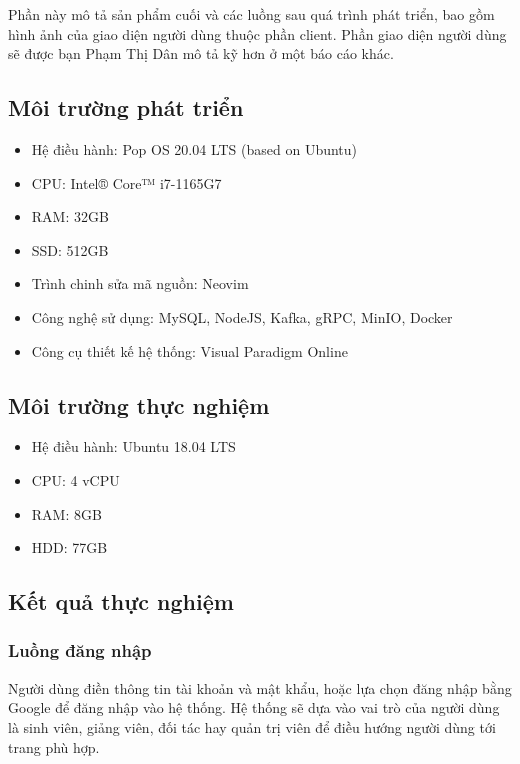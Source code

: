 \documentclass[./../main.tex]{subfiles}
\begin{document}
Phần này mô tả sản phẩm cuối và các luồng sau quá trình phát triển, bao gồm hình ảnh của giao diện người dùng thuộc phần client. Phần giao diện người dùng sẽ được bạn Phạm Thị Dân mô tả kỹ hơn ở một báo cáo khác.

\subsection{Môi trường phát triển}

\begin{itemize}
	\item Hệ điều hành: Pop OS 20.04 LTS (based on Ubuntu)
	\item CPU: Intel® Core™ i7-1165G7
	\item RAM: 32GB
	\item SSD: 512GB
	\item Trình chinh sửa mã nguồn: Neovim
	\item Công nghệ sử dụng: MySQL, NodeJS, Kafka, gRPC, MinIO, Docker
	\item Công cụ thiết kế hệ thống: Visual Paradigm Online
\end{itemize}

\subsection{Môi trường thực nghiệm}

\begin{itemize}
	\item Hệ điều hành: Ubuntu 18.04 LTS
	\item CPU: 4 vCPU
	\item RAM: 8GB
	\item HDD: 77GB
\end{itemize}

\subsection{Kết quả thực nghiệm}

\subsubsection{Luồng đăng nhập}

Người dùng điền thông tin tài khoản và mật khẩu, hoặc lựa chọn đăng nhập
bằng Google để đăng nhập vào hệ thống. Hệ thống sẽ dựa vào vai trò của
người dùng là sinh viên, giảng viên, đối tác hay quản trị viên để điều
hướng người dùng tới trang phù hợp.
\end{document}
